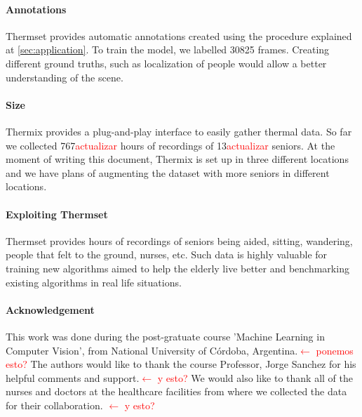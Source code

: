 \documentclass[oneside, twocolumn]{article}
\newcommand\myworries[1]{\textcolor{red}{#1}}
\begin{document}
\paragraph{Annotations}
Thermset provides automatic annotations created using the procedure explained at \autoref{sec:application}. To train the model, we labelled 30825 frames. Creating different ground truths, such as localization of people would allow a better understanding of the scene.
\paragraph{Size}
Thermix provides a plug-and-play interface to easily gather thermal data. So far we collected 767\myworries{actualizar} hours of recordings of 13\myworries{actualizar} seniors. At the moment of writing this document, Thermix is set up in three different locations and we have plans of augmenting the dataset with more seniors in different locations.

\paragraph{Exploiting Thermset}
Thermset provides hours of recordings of seniors being aided, sitting, wandering, people that felt to the ground, nurses, etc. Such data is highly valuable for training new algorithms aimed to help the elderly live better and benchmarking existing algorithms in real life situations.
\paragraph{Acknowledgement}
This work was done during the post-gratuate course 'Machine Learning in Computer Vision', from National University of C\'ordoba, Argentina.\myworries{$\leftarrow$ ponemos esto?} The authors would like to thank the course Professor, Jorge Sanchez for his helpful comments and support.\myworries{$\leftarrow$ y esto?}  We would also like to thank all of the nurses and doctors at the healthcare facilities from where we collected the data for their collaboration. \myworries{$\leftarrow$ y esto?}

\end{document}
